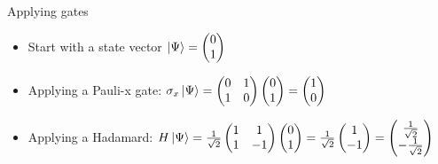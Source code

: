 \documentclass[14pt]{beamer}
\let\olditem\item
\renewcommand{\item}{%
\olditem\vspace{10pt}}
\begin{document}
\begin{frame}{Applying gates}
\begin{itemize}
	\item Start with a state vector $\ket{\Psi} = \begin{pmatrix}0 \\ 1\end{pmatrix}$
	\item Applying a Pauli-x gate: $\sigma_x \ket{\Psi} = \begin{pmatrix} 0 & 1 \\ 1 & 0 \end{pmatrix}\begin{pmatrix}0 \\ 1\end{pmatrix} = \begin{pmatrix}1 \\ 0\end{pmatrix}$
	\item Applying a Hadamard: $H \ket{\Psi} = \frac{1}{\sqrt{2}}\begin{pmatrix} 1 & 1 \\ 1 & -1 \end{pmatrix}\begin{pmatrix}0 \\ 1\end{pmatrix} = \frac{1}{\sqrt{2}}\begin{pmatrix}1 \\ -1\end{pmatrix} = \begin{pmatrix}\frac{1}{\sqrt{2}} \\ -\frac{1}{\sqrt{2}}\end{pmatrix}$
	
\end{itemize}
\end{frame}

\end{document}
